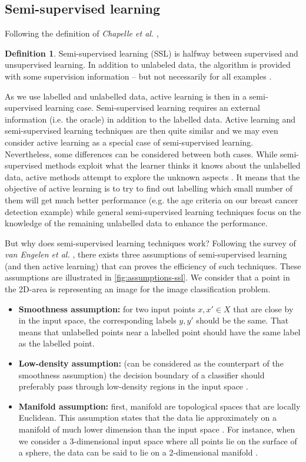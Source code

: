 \documentclass[11pt, openany]{report}
\theoremstyle{plain}
\theoremstyle{definition}
\newtheorem{defn}{Definition}[section]
\theoremstyle{remark}
\begin{document}
\subsection{Semi-supervised learning} \label{sec:SSL}
Following the definition of \textit{Chapelle et al.} \cite{book-SSL}, 

\begin{defn}
Semi-supervised learning (SSL) is halfway between supervised and unsupervised learning. In addition to unlabeled data, the algorithm is provided with some supervision information – but not necessarily for all examples \cite{book-SSL}. 
\end{defn}

As we use labelled and unlabelled data, active learning is then in a semi-supervised learning case. Semi-supervised learning requires an external information (i.e. the oracle) in addition to the labelled data. Active learning and semi-supervised learning techniques are then quite similar and we may even consider active learning as a special case of semi-supervised learning. Nevertheless, some differences can be considered between both cases. While semi-supervised methods exploit what the learner thinks it knows about the unlabelled data, active methods attempt to explore the unknown aspects \cite{AL-Survey}.  It means that the objective of active learning is to try to find out labelling which small number of them will get much better performance (e.g. the age criteria on our breast cancer detection example) while general semi-supervised learning techniques focus on the knowledge of the remaining unlabelled data to enhance the performance.

But why does semi-supervised learning techniques work? Following the survey of \textit{van Engelen et al.} \cite{SSL-survey},  there exists three assumptions of semi-supervised learning (and then active learning) that can proves the efficiency of such techniques. These assumptions are illustrated in \autoref{fig:assumptions-ssl}. We consider that a point in the 2D-area is representing an image for the image classification problem. 

\begin{itemize}
\item \textbf{Smoothness assumption:} for two input points $x, x' \in X$ that are close by in
the input space, the corresponding labels $y, y'$ should be the same. \cite{SSL-survey} That means that unlabelled points near a labelled point should have the same label as the labelled point.    
\item \textbf{Low-density assumption:} (can be considered as the counterpart of the smoothness assumption) the decision boundary of a classifier should preferably pass through low-density regions in the input space \cite{SSL-survey}. 
\item \textbf{Manifold assumption:} first, manifold are topological spaces that are locally Euclidean. This assumption states that the data lie approximately on a manifold of much lower dimension than the input space \cite{wiki-ssl}.  For instance, when we consider a 3-dimensional input space where all points lie on the surface of a sphere, the data can be said to lie on a 2-dimensional manifold \cite{SSL-survey}. 
\end{itemize}
\end{document}

